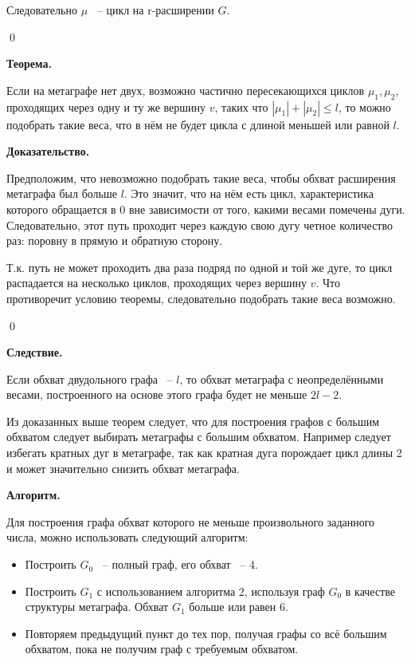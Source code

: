 \documentclass[14pt]{mmcs-article}
\begin{document}
Следовательно $\mu$ ~-- цикл на r-расширении $G$.

\qed

\pagebreak

\textbf{Теорема.}

Если на метаграфе нет двух, возможно частично пересекающихся циклов $\mu_1, \mu_2$, проходящих через одну и ту же вершину $v$, таких что  $|\mu_1| + |\mu_2| \le l$, то можно подобрать такие веса, что в нём не будет цикла с длиной меньшей или равной $l$.

\textbf{Доказательство.}

Предположим, что невозможно подобрать такие веса, чтобы обхват расширения метаграфа был больше $l$. Это значит, что на нём есть цикл, характеристика которого обращается в 0 вне зависимости от того, какими весами помечены дуги. Следовательно, этот путь проходит через каждую свою дугу четное количество раз: поровну в прямую и обратную сторону. 

Т.к. путь не может проходить два раза подряд по одной и той же дуге, то цикл распадается на несколько циклов, проходящих через вершину $v$. Что противоречит условию теоремы, следовательно подобрать такие веса возможно. 

\qed

\textbf{Следствие.}

Если обхват двудольного графа ~-- $l$, то обхват метаграфа с неопределёнными весами, построенного на основе этого графа будет не меньше $2l - 2$. 

Из доказанных выше теорем следует, что для построения графов с большим обхватом следует выбирать метаграфы с большим обхватом. Например следует избегать кратных дуг в метаграфе, так как кратная дуга порождает цикл длины 2 и может значительно снизить обхват метаграфа.

\textbf{Алгоритм.}

Для построения графа обхват которого не меньше произвольного заданного числа, можно использовать следующий алгоритм:

\begin{itemize}
    \item Построить $G_0$ ~-- полный граф, его обхват ~-- 4.
    \item Построить $G_1$ с использованием алгоритма 2, используя граф $G_0$ в качестве структуры метаграфа. Обхват $G_1$ больше или равен 6.
    \item Повторяем предыдущий пункт до тех пор, получая графы со всё большим обхватом, пока не получим граф с требуемым обхватом.  
\end{itemize}
\end{document}
